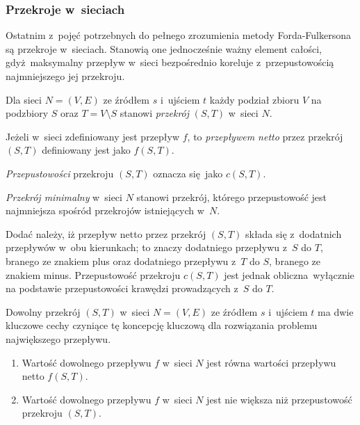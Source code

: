 \subsubsection{\textbf{Przekroje w~sieciach}}
\par{
  Ostatnim z~pojęć potrzebnych do pełnego zrozumienia metody Forda-Fulkersona są przekroje w~sieciach.
  Stanowią one jednocześnie ważny element całości, gdyż maksymalny przepływ w~sieci bezpośrednio koreluje z~przepustowością najmniejszego jej przekroju.
  \begin{definition}
    Dla sieci $N=(V, E)$ ze źródłem $s$ i~ujściem $t$ każdy podział zbioru $V$ na podzbiory $S$ oraz $T=V\setminus S$ stanowi \emph{przekrój} $(S,T)$ w~sieci $N$.

    Jeżeli w~sieci zdefiniowany jest przepływ $f$, to \emph{przepływem netto} przez przekrój $(S, T)$ definiowany jest jako $f(S, T)$.

    \emph{Przepustowości} przekroju $(S, T)$ oznacza się jako $c(S, T)$.

    \emph{Przekrój minimalny} w~sieci $N$ stanowi przekrój, którego przepustowość jest najmniejsza spośród przekrojów istniejących w~$N$.
  \end{definition}
}
\par{
  Dodać należy, iż przepływ netto przez przekrój $(S, T)$ składa się z~dodatnich przepływów w~obu kierunkach; to znaczy dodatniego przepływu z~$S$ do $T$, branego ze znakiem plus oraz dodatniego przepływu z~$T$ do $S$, branego ze znakiem minus.
  Przepustowość przekroju $c(S, T)$ jest jednak obliczna wyłącznie na podstawie przepustowości krawędzi prowadzących z~$S$ do $T$.
}
\par{
  Dowolny przekrój $(S, T)$ w~sieci $N=(V, E)$ ze źródłem $s$ i~ujściem $t$ ma dwie kluczowe cechy czyniące tę koncepcję kluczową dla rozwiązania problemu największego przepływu.
  \begin{enumerate}
    \item Wartość dowolnego przepływu $f$ w~sieci $N$ jest równa wartości przepływu netto $f(S,T)$.
    \item Wartość dowolnego przepływu $f$ w~sieci $N$ jest nie większa niż przepustowość przekroju $(S, T)$.
  \end{enumerate}
}

